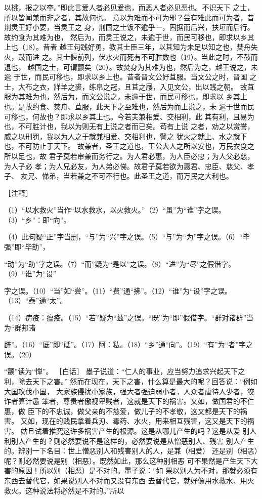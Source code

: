 \documentclass[12pt,UTF8]{ctexbook}
\begin{document}
以桃，报之以李。”即此言爱人者必见爱也，而恶人者必见恶也。不识天下 
之士，所以皆闻兼而非之者，其故何也。 
意以为难而不可为邪？尝有难此而可为者，昔荆灵王好小要，当灵王之 
身，荆国之士饭不逾乎一，固据而后兴，扶垣而后行。故约食为其难为也， 
然后为，而灵王说之，未逾于世，而民可移也，即求以乡其上也（18）。昔者 
越王句践好勇，教其士臣三年，以其知为未足以知之也，焚舟失火，鼓而进 
之。其士偃前列，伏水火而死有不可胜数也（19）。当此之时，不鼓而退也， 
越国之士，可谓颤矣（20）。故焚身为其难为也，然后为之，越王说之，未逾 
于世，而民可移也，即求以乡上也。昔者晋文公好苴服。当文公之时，晋国 
之士，大布之衣，牂羊之裘，练帛之冠，且苴之屦，入见文公，出以践之朝。 
故苴服为其难为也，然后为，而文公说之，未逾于世，而民可移也，即求以 
乡其上也。是故约食、焚舟、苴服，此天下之至难也，然后为而上说之，未 
逾于世而民可移也，何故也？即求以乡其上也。今若夫兼相爱、交相利，此 
其有利，且易为也，不可胜计也，我以为则无有上说之者而已矣。苟有上说 
之者，劝之以赏誉，威之以刑罚，我以为人之于就兼相爱、交相利也，譬之 
犹火之就上、水之就下也，不可防止于天下。 
故兼者，圣王之道也，王公大人之所以安也，万民衣食之所以足也，故 
君子莫若审兼而务行之。为人君必惠，为人臣必忠；为人父必慈，为人子必 
孝；为人兄必友，为人弟必悌。故君子莫若欲为惠君、忠臣、慈父、孝子、 
友兄、悌弟，当若兼之不可不行也。此圣王之道，而万民之大利也。 


［注释］ 

（1）“以水救火”当作“以水救水，以火救火。”（2）“虽”为“谁”字之误。（3）“乡”：即“向”。 

（4）此句疑“正”字当删，“与”为“兴”字之误。（5）“与”为“为”字之误。（6）“毕强”即“毕劼”， 

“动”为“助”字之误。（7）“而”疑为“是以”之误。（8）“进”为“尽”之假借字。（9）“谁”为“设” 

字之误。（10）“当”如“尝”。（11）“费”通“拂”。（12）“谁”为“设”字之误。（13）“泰”通“太”。 

（14）疠疫：瘟疫。（15）“若”疑为“兹”之误。“既”为“即”假借字。“群对诸群”当为“群邦诸 

辟”。（16）“厎”即“砥”。（17）阿：私。（18）“乡”通“向”。（19）“有”为“者”字之误。（20） 

“颤”读为“惮”。 
［白话］ 
墨子说道：“仁人的事业，应当努力追求兴起天下之利，除去天下之害。” 
然而在现在，天下之害，什么算是最大的呢？回答说：“例如大国攻伐小国， 
大家族侵扰小家族，强大者强迫弱小者，人众者虐待人少者，狡诈者算计愚 
笨者，尊贵者傲视卑贱者，这就是天下的祸害。又如，做国君的不仁惠，做 
臣下的不忠诚，做父亲的不慈爱，做儿子的不孝敬，这又都是天下的祸害。 
又如，现在的贱民拿着兵刃、毒药、水火，用来相互残害，这又是天下的祸 
害。 
姑且试着推究这许多祸害产生的根源。这是从哪儿产生的吗？这是从爱 
别人利别人产生的？则必然要说不是这样的，必然要说是从憎恶别人、残害 
别人产生的。辨别一下名目：世上憎恶别人和残害别人的人，是兼（相爱） 
还是别（相恶）呢？则必然要说是别（相恶）。既然如此，那么这种别相恶 
可不果然是产生天下大害的原因！所以别（相恶）是不对的。墨子说：“如 
果以别人为不对，那就必须有东西去替代它，如果说别人不对而又没有东西 
去替代它，就好像用水救水、用火救火。这种说法将必然是不对的。”所以 
\end{document}
